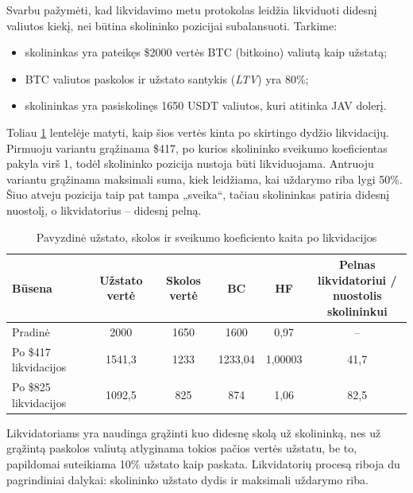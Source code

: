 \documentclass[]{VUMIFTemplateClass}
\begin{document}
Svarbu pažymėti, kad likvidavimo metu protokolas leidžia likviduoti didesnį valiutos kiekį, nei būtina skolininko pozicijai subalansuoti. Tarkime:
\begin{itemize}
  \item skolininkas yra pateikęs \$2000 vertės BTC (bitkoino) valiutą kaip užstatą;
  \item BTC valiutos paskolos ir užstato santykis (\textit{LTV}) yra 80\%;
  \item skolininkas yra pasiskolinęs 1650 USDT valiutos, kuri atitinka JAV dolerį.
\end{itemize}

Toliau \ref{tab:likvidacijos_pav} lentelėje matyti, kaip šios vertės kinta po skirtingo dydžio likvidacijų.
Pirmuoju variantu grąžinama \$417, po kurios skolininko sveikumo koeficientas pakyla virš 1, todėl
skolininko pozicija nustoja būti likviduojama.
Antruoju variantu grąžinama maksimali suma, kiek leidžiama, kai uždarymo riba lygi 50\%.
Šiuo atveju pozicija taip pat tampa „sveika“, tačiau skolininkas patiria didesnį nuostolį, o likvidatorius – didesnį pelną.

\begin{table}[h!]
  \centering
  \begin{tabular}{lccccc}
  \hline
  \textbf{Būsena} 
  & \textbf{Užstato vertė}
  & \textbf{Skolos vertė}
  & \textbf{BC}
  & \textbf{HF}
  & \makecell{\textbf{Pelnas likvidatoriui /}\\ \textbf{nuostolis skolininkui}} \\ 
  \hline
  Pradinė                
  & 2000      
  & 1650      
  & 1600      
  & 0,97    
  & --         \\
  
  Po \$417 likvidacijos  
  & 1541,3    
  & 1233      
  & 1233,04   
  & 1,00003   
  & 41,7       \\
  
  Po \$825 likvidacijos  
  & 1092,5    
  & 825       
  & 874       
  & 1,06      
  & 82,5       \\
  \hline
  \end{tabular}
  \caption{Pavyzdinė užstato, skolos ir sveikumo koeficiento kaita po likvidacijos}
  \label{tab:likvidacijos_pav}
  \end{table}

Likvidatoriams yra naudinga grąžinti kuo didesnę skolą už skolininką, nes už grąžintą paskolos valiutą atlyginama tokios pačios vertės užstatu, be to, papildomai suteikiama 10\% užstato kaip paskata. Likvidatorių procesą riboja du pagrindiniai dalykai: skolininko užstato dydis ir maksimali uždarymo riba.
\end{document}
